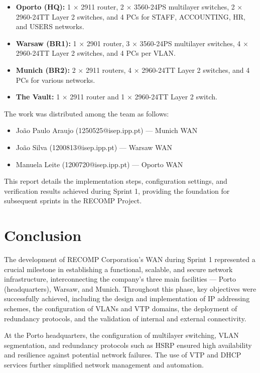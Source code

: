 \documentclass[a4paper,12pt]{report}
\begin{document}
\begin{itemize}
    \item \textbf{Oporto (HQ):} 1 × 2911 router, 2 × 3560-24PS multilayer switches, 2 × 2960-24TT Layer 2 switches, and 4 PCs for STAFF, ACCOUNTING, HR, and USERS networks.
    \item \textbf{Warsaw (BR1):} 1 × 2901 router, 3 × 3560-24PS multilayer switches, 4 × 2960-24TT Layer 2 switches, and 4 PCs per VLAN.
    \item \textbf{Munich (BR2):} 2 × 2911 routers, 4 × 2960-24TT Layer 2 switches, and 4 PCs for various networks.
    \item \textbf{The Vault:} 1 × 2911 router and 1 × 2960-24TT Layer 2 switch.
\end{itemize}

The work was distributed among the team as follows:

\begin{itemize}
    \item João Paulo Araujo (1250525@isep.ipp.pt) — Munich \ac{WAN}
    \item João Silva (1200813@isep.ipp.pt) — Warsaw \ac{WAN}
    \item Manuela Leite (1200720@isep.ipp.pt) — Oporto \ac{WAN}
\end{itemize}

This report details the implementation steps, configuration settings, and verification results achieved during Sprint 1, providing the foundation for subsequent sprints in the \ac{RECOMP} Project.





\chapter{Conclusion}

The development of RECOMP Corporation's WAN during Sprint 1 represented a crucial milestone in establishing a functional, scalable, and secure network infrastructure, interconnecting the company's three main facilities — Porto (headquarters), Warsaw, and Munich. Throughout this phase, key objectives were successfully achieved, including the design and implementation of IP addressing schemes, the configuration of VLANs and VTP domains, the deployment of redundancy protocols, and the validation of internal and external connectivity.

At the Porto headquarters, the configuration of multilayer switching, VLAN segmentation, and redundancy protocols such as HSRP ensured high availability and resilience against potential network failures. The use of VTP and DHCP services further simplified network management and automation.
\end{document}
